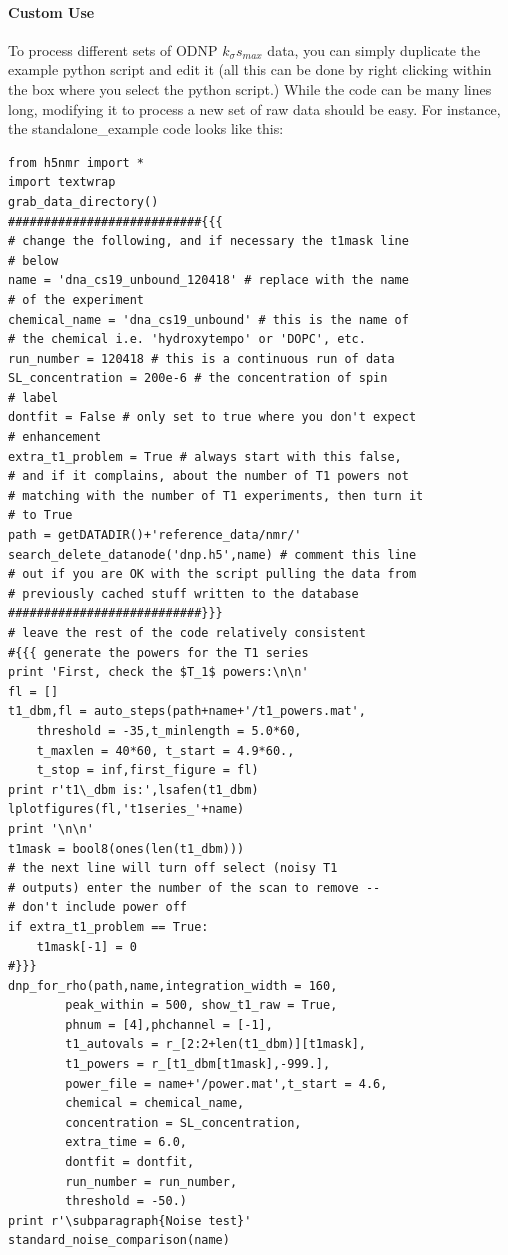 \paragraph{Custom Use}
To process different sets of ODNP $k_\sigma s_{max}$ data,
    you can simply duplicate the example python script
    and edit it
    (all this can be done by right clicking
    within the box where you select the python script.)
While the code can be many lines long,
    modifying it to process a new set of raw data should be easy.
For instance, the standalone\_example code looks like this:\\ 
    \begin{lstlisting}
from h5nmr import *
import textwrap
grab_data_directory()
###########################{{{
# change the following, and if necessary the t1mask line
# below
name = 'dna_cs19_unbound_120418' # replace with the name
# of the experiment
chemical_name = 'dna_cs19_unbound' # this is the name of
# the chemical i.e. 'hydroxytempo' or 'DOPC', etc.
run_number = 120418 # this is a continuous run of data
SL_concentration = 200e-6 # the concentration of spin
# label
dontfit = False # only set to true where you don't expect
# enhancement
extra_t1_problem = True # always start with this false,
# and if it complains, about the number of T1 powers not
# matching with the number of T1 experiments, then turn it
# to True
path = getDATADIR()+'reference_data/nmr/'
search_delete_datanode('dnp.h5',name) # comment this line
# out if you are OK with the script pulling the data from
# previously cached stuff written to the database
###########################}}}
# leave the rest of the code relatively consistent
#{{{ generate the powers for the T1 series
print 'First, check the $T_1$ powers:\n\n'
fl = []
t1_dbm,fl = auto_steps(path+name+'/t1_powers.mat',
    threshold = -35,t_minlength = 5.0*60,
    t_maxlen = 40*60, t_start = 4.9*60.,
    t_stop = inf,first_figure = fl)
print r't1\_dbm is:',lsafen(t1_dbm)
lplotfigures(fl,'t1series_'+name)
print '\n\n'
t1mask = bool8(ones(len(t1_dbm)))
# the next line will turn off select (noisy T1
# outputs) enter the number of the scan to remove --
# don't include power off
if extra_t1_problem == True:
    t1mask[-1] = 0
#}}}
dnp_for_rho(path,name,integration_width = 160,
        peak_within = 500, show_t1_raw = True,
        phnum = [4],phchannel = [-1],
        t1_autovals = r_[2:2+len(t1_dbm)][t1mask],
        t1_powers = r_[t1_dbm[t1mask],-999.],
        power_file = name+'/power.mat',t_start = 4.6,
        chemical = chemical_name,
        concentration = SL_concentration,
        extra_time = 6.0,
        dontfit = dontfit,
        run_number = run_number,
        threshold = -50.)
print r'\subparagraph{Noise test}'
standard_noise_comparison(name)
    \end{lstlisting}
